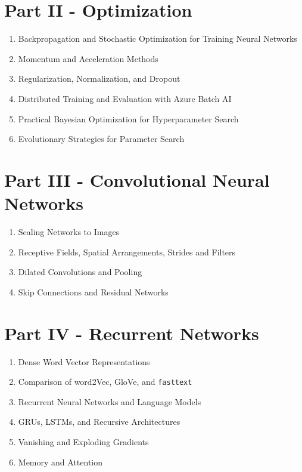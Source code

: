 \documentclass[]{book}
\providecommand{\tightlist}{%
  \setlength{\itemsep}{0pt}\setlength{\parskip}{0pt}}
\theoremstyle{definition}
\theoremstyle{definition}
\theoremstyle{definition}
\theoremstyle{remark}
\begin{document}
\section{Part II - Optimization}\label{part-ii---optimization}

\begin{enumerate}
\def\labelenumi{\arabic{enumi}.}
\tightlist
\item
  Backpropagation and Stochastic Optimization for Training Neural
  Networks
\item
  Momentum and Acceleration Methods
\item
  Regularization, Normalization, and Dropout
\item
  Distributed Training and Evaluation with Azure Batch AI
\item
  Practical Bayesian Optimization for Hyperparameter Search
\item
  Evolutionary Strategies for Parameter Search
\end{enumerate}

\section{Part III - Convolutional Neural
Networks}\label{part-iii---convolutional-neural-networks}

\begin{enumerate}
\def\labelenumi{\arabic{enumi}.}
\tightlist
\item
  Scaling Networks to Images
\item
  Receptive Fields, Spatial Arrangements, Strides and Filters
\item
  Dilated Convolutions and Pooling
\item
  Skip Connections and Residual Networks
\end{enumerate}

\section{Part IV - Recurrent
Networks}\label{part-iv---recurrent-networks}

\begin{enumerate}
\def\labelenumi{\arabic{enumi}.}
\tightlist
\item
  Dense Word Vector Representations
\item
  Comparison of word2Vec, GloVe, and \texttt{fasttext}
\item
  Recurrent Neural Networks and Language Models
\item
  GRUs, LSTMs, and Recursive Architectures
\item
  Vanishing and Exploding Gradients
\item
  Memory and Attention
\end{enumerate}
\end{document}
